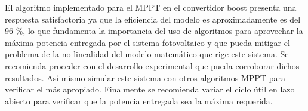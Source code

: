 \documentclass[10pt,twocolumn]{article}
\begin{document}
El algoritmo implementado para el MPPT en el convertidor boost presenta una respuesta satisfactoria ya que la eficiencia del modelo es aproximadamente es del 96 $\%$, lo que fundamenta la importancia del uso de algoritmos para aprovechar la máxima potencia entregada por el sistema fotovoltaico y que pueda mitigar el problema de la no linealidad del modelo matemático que rige este sistema.
Se recomienda proceder con el desarrollo experimental que pueda corroborar dichos resultados. Así mismo simular este sistema con otros algoritmos MPPT para verificar el más apropiado. Finalmente se recomienda variar el ciclo útil en lazo abierto para verificar que la potencia entregada sea la máxima requerida.
\newpage



\end{document}

